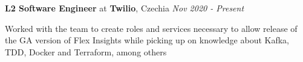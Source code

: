 
{\textbf{L2 Software Engineer} at \textbf{Twilio}, Czechia} 
    \hfill {\em Nov 2020 - Present}
    
    Worked with the team to create roles and services necessary to allow release of the GA version of Flex Insights while picking up on knowledge about Kafka, TDD, Docker and Terraform, among others
    
